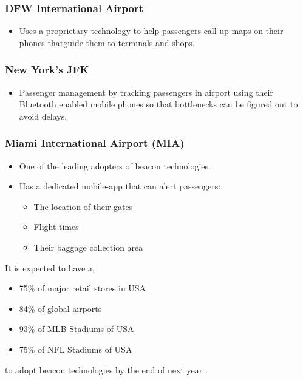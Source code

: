 \documentclass[journal, a4paper]{IEEEtran}
\begin{document}
\subsubsection{DFW International Airport}

\begin{itemize}
\item Uses a proprietary technology to help passengers call up maps on their phones thatguide them to terminals and shops.
\end{itemize}

\subsubsection{New York's JFK}
\begin{itemize}
\item Passenger management by tracking passengers in airport using their Bluetooth enabled mobile phones so that bottlenecks can be figured out to avoid delays.
\end{itemize}

\subsubsection{Miami International Airport (MIA)}

\begin{itemize}
\item One of the leading adopters of beacon technologies.
\item Has a dedicated mobile-app that can alert passengers:
	\begin{itemize}
	\item The location of their gates
	\item Flight times
	\item Their baggage collection area
	\end{itemize}
	
\end{itemize}

It is expected to have a,

\begin{itemize}
\item 75\% of major retail stores in USA
\item 84\% of global airports
\item 93\% of MLB Stadiums of USA
\item 75\% of NFL Stadiums of USA
\end{itemize}

to adopt beacon technologies by the end of next year \cite{BEACONS}.
\end{document}
